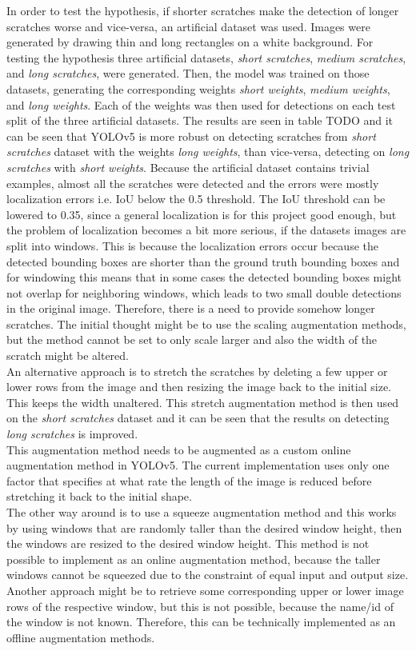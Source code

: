 In order to test the hypothesis, if shorter scratches make the detection of longer scratches worse and vice-versa, an artificial dataset was used. Images were generated by drawing thin and long rectangles on a white background. For testing the hypothesis three artificial datasets, \textit{short scratches}, \textit{medium scratches}, and \textit{long scratches}, were generated. Then, the model was trained on those datasets, generating the corresponding weights \textit{short weights}, \textit{medium weights}, and \textit{long weights}. Each of the weights was then used for detections on each test split of the three artificial datasets. The results are seen in table TODO and it can be seen that YOLOv5 is more robust on detecting scratches from \textit{short scratches} dataset with the weights \textit{long weights}, than vice-versa, detecting on \textit{long scratches} with \textit{short weights}. Because the artificial dataset contains trivial examples, almost all the scratches were detected and the errors were mostly localization errors i.e. IoU below the 0.5 threshold. The IoU threshold can be lowered to 0.35, since a general localization is for this project good enough, but the problem of localization becomes a bit more serious, if the datasets images are split into windows. This is because the localization errors occur because the detected bounding boxes are shorter than the ground truth bounding boxes and for windowing this means that in some cases the detected bounding boxes might not overlap for neighboring windows, which leads to two small double detections in the original image. Therefore, there is a need to provide somehow longer scratches. The initial thought might be to use the scaling augmentation methods, but the method cannot be set to only scale larger and also the width of the scratch might be altered. \\
An alternative approach is to stretch the scratches by deleting a few upper or lower rows from the image and then resizing the image back to the initial size. This keeps the width unaltered. This stretch augmentation method is then used on the \textit{short scratches} dataset and it can be seen that the results on detecting \textit{long scratches} is improved. \\
This augmentation method needs to be augmented as a custom online augmentation method in YOLOv5. The current implementation uses only one factor that specifies at what rate the length of the image is reduced before stretching it back to the initial shape. \\
The other way around is to use a squeeze augmentation method and this works by using windows that are randomly taller than the desired window height, then the windows are resized to the desired window height. This method is not possible to implement as an online augmentation method, because the taller windows cannot be squeezed due to the constraint of equal input and output size. Another approach might be to retrieve some corresponding upper or lower image rows of the respective window, but this is not possible, because the name/id of the window is not known. Therefore, this can be technically implemented as an offline augmentation methods. \\

